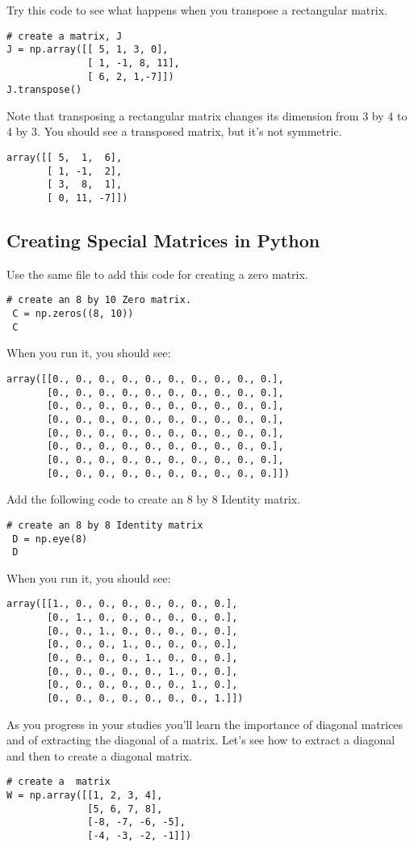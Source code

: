 Try this code to see what happens when you transpose a rectangular matrix. 
\begin{Verbatim}
# create a matrix, J
J = np.array([[ 5, 1, 3, 0], 
              [ 1, -1, 8, 11], 
              [ 6, 2, 1,-7]])
J.transpose()
\end{Verbatim}
Note that transposing a rectangular matrix changes its dimension from 3 by 4 to 4 by 3. You should see a transposed matrix, but it's not symmetric.
\begin{Verbatim}
array([[ 5,  1,  6],
       [ 1, -1,  2],
       [ 3,  8,  1],
       [ 0, 11, -7]])
\end{Verbatim}

\subsection{Creating Special Matrices in Python}
 Use the same file to add this code for creating a zero matrix.
\begin{Verbatim}
# create an 8 by 10 Zero matrix.
 C = np.zeros((8, 10))
 C
\end{Verbatim}
When you run it, you should see:
\begin{Verbatim}
array([[0., 0., 0., 0., 0., 0., 0., 0., 0., 0.],
       [0., 0., 0., 0., 0., 0., 0., 0., 0., 0.],
       [0., 0., 0., 0., 0., 0., 0., 0., 0., 0.],
       [0., 0., 0., 0., 0., 0., 0., 0., 0., 0.],
       [0., 0., 0., 0., 0., 0., 0., 0., 0., 0.],
       [0., 0., 0., 0., 0., 0., 0., 0., 0., 0.],
       [0., 0., 0., 0., 0., 0., 0., 0., 0., 0.],
       [0., 0., 0., 0., 0., 0., 0., 0., 0., 0.]])
\end{Verbatim}
Add the following code to create an 8 by 8 Identity matrix.
\begin{Verbatim}
# create an 8 by 8 Identity matrix 
 D = np.eye(8)
 D
\end{Verbatim}
When you run it, you should see:
\begin{Verbatim}
array([[1., 0., 0., 0., 0., 0., 0., 0.],
       [0., 1., 0., 0., 0., 0., 0., 0.],
       [0., 0., 1., 0., 0., 0., 0., 0.],
       [0., 0., 0., 1., 0., 0., 0., 0.],
       [0., 0., 0., 0., 1., 0., 0., 0.],
       [0., 0., 0., 0., 0., 1., 0., 0.],
       [0., 0., 0., 0., 0., 0., 1., 0.],
       [0., 0., 0., 0., 0., 0., 0., 1.]])
\end{Verbatim}
As you progress in your studies you'll learn the importance of diagonal matrices and of extracting the diagonal of a matrix. Let's see how to extract a diagonal and then to create a diagonal matrix.
\begin{Verbatim}
# create a  matrix 
W = np.array([[1, 2, 3, 4], 
              [5, 6, 7, 8], 
              [-8, -7, -6, -5],
              [-4, -3, -2, -1]])
\end{Verbatim}
